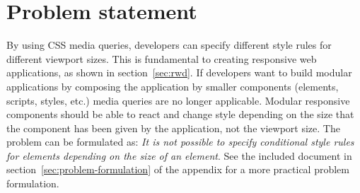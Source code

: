 \documentclass[a4paper,11pt]{kth-mag}
\begin{document}
    \section{Problem statement}\label{sec:problem}
      By using \gls{CSS} \gls{media queries}, developers can specify different style rules for different \gls{viewport} sizes.
      This is fundamental to creating \gls{responsive} \gls{web} applications, as shown in section~\ref{sec:rwd}.
      If developers want to build modular applications by composing the application by smaller components (\glspl{element}, scripts, styles, etc.) \gls{media queries} are no longer applicable.
      Modular \gls{responsive} components should be able to react and change style depending on the size that the component has been given by the application, not the \gls{viewport} size. 
      The problem can be formulated as: \emph{It is not possible to specify conditional style rules for \glspl{element} depending on the size of an element}.
      See the included document in section~\ref{sec:problem-formulation} of the appendix for a more practical problem formulation.
\end{document}

